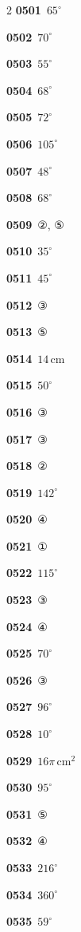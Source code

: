 \documentclass[10pt,a4paper]{article}
\begin{document}
\begin{multicols}{2}
\noindent\textbf{0501}\ $65^\circ$\par
\noindent\textbf{0502}\ $70^\circ$\par
\noindent\textbf{0503}\ $55^\circ$\par
\noindent\textbf{0504}\ $68^\circ$\par
\noindent\textbf{0505}\ $72^\circ$\par
\noindent\textbf{0506}\ $105^\circ$\par
\noindent\textbf{0507}\ $48^\circ$\par
\noindent\textbf{0508}\ $68^\circ$\par
\noindent\textbf{0509}\ ②, ⑤\par
\noindent\textbf{0510}\ $35^\circ$\par
\noindent\textbf{0511}\ $45^\circ$\par
\noindent\textbf{0512}\ ③\par
\noindent\textbf{0513}\ ⑤\par
\noindent\textbf{0514}\ $14\,\mathrm{cm}$\par
\noindent\textbf{0515}\ $50^\circ$\par
\noindent\textbf{0516}\ ③\par
\noindent\textbf{0517}\ ③\par
\noindent\textbf{0518}\ ②\par
\noindent\textbf{0519}\ $142^\circ$\par
\noindent\textbf{0520}\ ④\par
\noindent\textbf{0521}\ ①\par
\noindent\textbf{0522}\ $115^\circ$\par
\noindent\textbf{0523}\ ③\par
\noindent\textbf{0524}\ ④\par
\noindent\textbf{0525}\ $70^\circ$\par
\noindent\textbf{0526}\ ③\par
\noindent\textbf{0527}\ $96^\circ$\par
\noindent\textbf{0528}\ $10^\circ$\par
\noindent\textbf{0529}\ $16\pi\,\mathrm{cm}^2$\par
\noindent\textbf{0530}\ $95^\circ$\par
\noindent\textbf{0531}\ ⑤\par
\noindent\textbf{0532}\ ④\par
\noindent\textbf{0533}\ $216^\circ$\par
\noindent\textbf{0534}\ $360^\circ$\par
\noindent\textbf{0535}\ $59^\circ$\par

\end{multicols}
\end{document}
